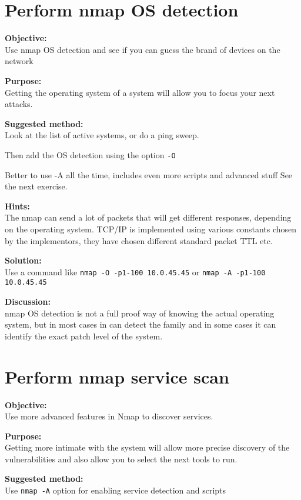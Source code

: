 \documentclass[a4paper,11pt,notitlepage]{report}
\begin{document}
\chapter{Perform nmap OS detection}
\label{ex:nmap-os}

{\bf Objective:} \\
Use nmap OS detection and see if you can guess the brand of devices on the network

{\bf Purpose:}\\
Getting the operating system of a system will allow you to focus your next attacks.

{\bf Suggested method:}\\
Look at the list of active systems, or do a ping sweep.

Then add the OS detection using the option \verb+-O+

Better to use -A all the time, includes even more scripts and advanced stuff
See the next exercise.

{\bf Hints:} \\

The nmap can send a lot of packets that will get different responses, depending on the operating system. TCP/IP is implemented using various constants chosen by the implementors, they have chosen different standard packet TTL etc.

{\bf Solution:}\\
Use a command like \verb+nmap -O -p1-100 10.0.45.45+ or  \verb+nmap -A -p1-100 10.0.45.45+


{\bf Discussion:}\\
nmap OS detection is not a full proof way of knowing the actual operating system, but in most cases in can detect the family and in some cases it can identify the exact patch level of the system.

\chapter{Perform nmap service scan}
\label{ex:nmap-service}

{\bf Objective:} \\
Use more advanced features in Nmap to discover services.

{\bf Purpose:}\\
Getting more intimate with the system will allow more precise discovery of the vulnerabilities and also allow you to select the next tools to run.

{\bf Suggested method:}\\
Use \verb+nmap -A+ option for enabling service detection and scripts
\end{document}
